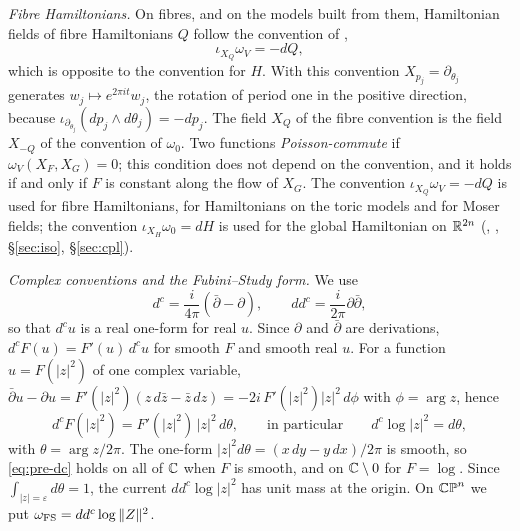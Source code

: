 \emph{Fibre Hamiltonians.} On fibres, and on the models built from them, Hamiltonian fields of fibre
Hamiltonians $Q$ follow the convention of \cite{OpenAI2026},
\[
 \iota_{X_Q}\omega_V=-dQ ,
\]
which is opposite to the convention for $H$. With this convention $X_{p_j}=\partial_{\theta_j}$ generates
$w_j\mapsto e^{2\pi it}w_j$, the rotation of period one in the positive direction, because
$\iota_{\partial_{\theta_j}}(dp_j\wedge d\theta_j)=-dp_j$. The field $X_Q$ of the fibre convention is the field
$X_{-Q}$ of the convention of $\omega_0$. Two functions \emph{Poisson-commute} if $\omega_V(X_F,X_G)=0$; this
condition does not depend on the convention, and it holds if and only if $F$ is constant along the
flow of $X_G$. The convention $\iota_{X_Q}\omega_V=-dQ$ is used for fibre Hamiltonians, for Hamiltonians
on the toric models and for Moser fields; the convention $\iota_{X_H}\omega_0=dH$ is used for the global Hamiltonian
on $\mathbb{R}^{2n}$ (, , \S\ref{sec:iso}, \S\ref{sec:cpl}).

\emph{Complex conventions and the Fubini--Study form.} We use
\[
 d^c=\frac{i}{4\pi}(\bar\partial-\partial),\qquad dd^c=\frac{i}{2\pi}\partial\bar\partial ,
\]
so that $d^cu$ is a real one-form for real $u$. Since $\partial$ and $\bar\partial$ are derivations,
$d^cF(u)=F'(u)\,d^cu$ for smooth $F$ and smooth real $u$. For a function $u=F(|z|^2)$ of one complex variable,
$\bar\partial u-\partial u=F'(|z|^2)(z\,d\bar z-\bar z\,dz)=-2i\,F'(|z|^2)|z|^2\,d\phi$ with $\phi=\arg z$, hence
\begin{equation}\label{eq:pre-dc}
 d^cF(|z|^2)=F'(|z|^2)\,|z|^2\,d\theta,\qquad\text{in particular}\qquad d^c\log|z|^2=d\theta,
\end{equation}
with $\theta=\arg z/2\pi$. The one-form $|z|^2d\theta=(x\,dy-y\,dx)/2\pi$ is smooth, so \eqref{eq:pre-dc} holds
on all of $\mathbb{C}$ when $F$ is smooth, and on $\mathbb{C}\setminus0$ for $F=\log$. Since $\int_{|z|=\varepsilon}d\theta=1$,
the current $dd^c\log|z|^2$ has unit mass at the origin. On $\mathbb{CP}^n$ we put
$\omega_{\rm FS}=dd^c\log\|Z\|^2$.

